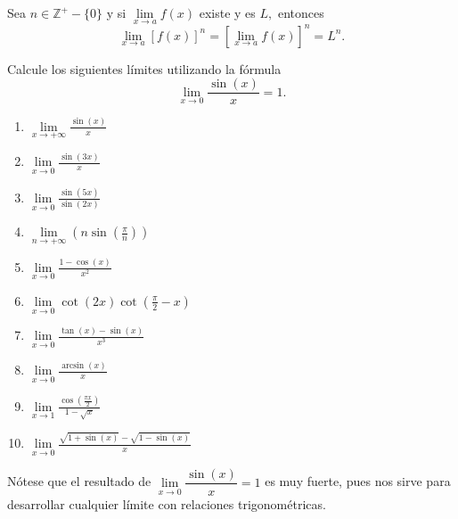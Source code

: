 \begin{property}
	Sea \(n\in\mathbb{Z}^+-\{0\}\) y si \(\lim\limits_{x\to a}f(x)\) existe y es \(L,\) entonces
	\[
	\lim\limits_{x\to a}\left[f(x)\right]^n=\left[\lim\limits_{x\to a}f(x)\right]^n=L^n.
	\]
\end{property}

\begin{exercise}
	Calcule los siguientes l\'imites utilizando la f\'ormula
	\[\lim\limits_{x\to 0}\dfrac{\sin(x)}{x}=1.\]
	\begin{multicols}{2}
		\begin{enumerate}
			\item \(\lim\limits_{x\to+\infty}{\frac{\sin(x)}{x}}\)
			\item \(\lim\limits_{x\to 0}\frac{\sin(3x)}{x}\)
			\item \(\lim\limits_{x\to 0}\frac{\sin(5x)}{\sin(2x)}\)
			\item \(\lim\limits_{n\to +\infty}\left(n\sin\left(\frac{\pi}{n}\right)\right)\)
			\item \(\lim\limits_{x\to 0}\frac{1-\cos(x)}{x^2}\)
			\item \(\lim\limits_{x\to 0}\cot(2x)\cot\left(\frac{\pi}{2}-x\right)\)
			\item \(\lim\limits_{x\to 0}\frac{\tan(x)-\sin(x)}{x^3}\)
			\item \(\lim\limits_{x\to 0}\frac{\arcsin(x)}{x}\)
			\item \(\lim\limits_{x\to 1}\frac{\cos\left(\frac{\pi x}{2}\right)}{1-\sqrt{x}}\)
			\item \(\lim\limits_{x\to 0}\frac{\sqrt{1+\sin(x)}-\sqrt{1-\sin(x)}}{x}\)
		\end{enumerate}
	\end{multicols}
\end{exercise}
N\'otese que el resultado de \(\lim\limits_{x\to 0}\dfrac{\sin(x)}{x}=1\) es muy fuerte, pues nos sirve para desarrollar cualquier l\'imite con relaciones trigonom\'etricas.	\newline

